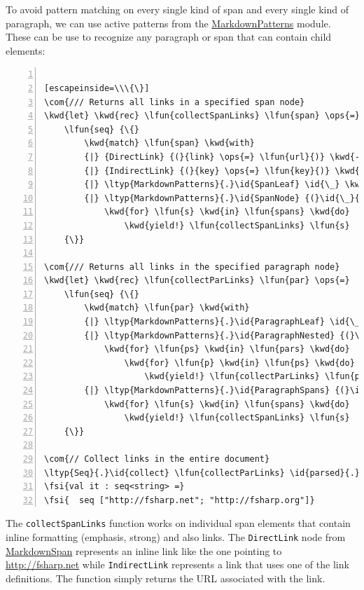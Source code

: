 \documentclass{article}
\newcommand{\id}[1]{\textcolor{black}{#1}}
\newcommand{\com}[1]{\textcolor{officegreen}{#1}}
\newcommand{\kwd}[1]{\textcolor{navy}{#1}}
\newcommand{\ops}[1]{\textcolor{purple}{#1}}
\newcommand{\fsi}[1]{\textcolor{outputcolor}{#1}}
\begin{document}
To avoid pattern matching on every single kind of span and every single kind of
paragraph, we can use active patterns from the \href{https://fsprojects.github.io/FSharp.Formatting/reference/fsharp-formatting-markdown-markdownpatterns.html}{MarkdownPatterns} module. These can be use
to recognize any paragraph or span that can contain child elements:
\begin{lstlisting}[numbers=left]

[escapeinside=\\\{\}]
\com{/// Returns all links in a specified span node}
\kwd{let} \kwd{rec} \lfun{collectSpanLinks} \lfun{span} \ops{=}
    \lfun{seq} {\{}
        \kwd{match} \lfun{span} \kwd{with}
        {|} {DirectLink} {(}{link} \ops{=} \lfun{url}{)} \kwd{->} \kwd{yield} \lfun{url}
        {|} {IndirectLink} {(}{key} \ops{=} \lfun{key}{)} \kwd{->} \kwd{yield} \lfun{fst} {(}\id{parsed}{.}\id{DefinedLinks}{.}{[}\lfun{key}{]}{)}
        {|} \ltyp{MarkdownPatterns}{.}\id{SpanLeaf} \id{\_} \kwd{->} {(}{)}
        {|} \ltyp{MarkdownPatterns}{.}\id{SpanNode} {(}\id{\_}{,} \lfun{spans}{)} \kwd{->}
            \kwd{for} \lfun{s} \kwd{in} \lfun{spans} \kwd{do}
                \kwd{yield!} \lfun{collectSpanLinks} \lfun{s}
    {\}}

\com{/// Returns all links in the specified paragraph node}
\kwd{let} \kwd{rec} \lfun{collectParLinks} \lfun{par} \ops{=}
    \lfun{seq} {\{}
        \kwd{match} \lfun{par} \kwd{with}
        {|} \ltyp{MarkdownPatterns}{.}\id{ParagraphLeaf} \id{\_} \kwd{->} {(}{)}
        {|} \ltyp{MarkdownPatterns}{.}\id{ParagraphNested} {(}\id{\_}{,} \lfun{pars}{)} \kwd{->}
            \kwd{for} \lfun{ps} \kwd{in} \lfun{pars} \kwd{do}
                \kwd{for} \lfun{p} \kwd{in} \lfun{ps} \kwd{do}
                    \kwd{yield!} \lfun{collectParLinks} \lfun{p}
        {|} \ltyp{MarkdownPatterns}{.}\id{ParagraphSpans} {(}\id{\_}{,} \lfun{spans}{)} \kwd{->}
            \kwd{for} \lfun{s} \kwd{in} \lfun{spans} \kwd{do}
                \kwd{yield!} \lfun{collectSpanLinks} \lfun{s}
    {\}}

\com{// Collect links in the entire document}
\ltyp{Seq}{.}\id{collect} \lfun{collectParLinks} \id{parsed}{.}\id{Paragraphs}
\fsi{val it : seq<string> =}
\fsi{  seq ["http://fsharp.net"; "http://fsharp.org"]}

\end{lstlisting}



The \texttt{collectSpanLinks} function works on individual span elements that contain inline
formatting (emphasis, strong) and also links. The \texttt{DirectLink} node from \href{https://fsprojects.github.io/FSharp.Formatting/reference/fsharp-formatting-markdown-markdownspan.html}{MarkdownSpan} represents an inline
link like the one pointing to \href{http://fsharp.net}{http://fsharp.net} while \texttt{IndirectLink} represents a
link that uses one of the link definitions. The function simply returns the URL associated
with the link.
\end{document}
